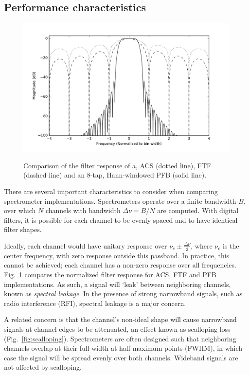 \documentclass{ws-rv961x669}
\begin{document}
\subsection{Performance characteristics}

\begin{figure}
 \centering
 \includegraphics[width=\textwidth]{./figures/fb_comparison}
 \label{fig:pfb_response}
 \caption{Comparison of the filter response of a, ACS (dotted line), FTF (dashed line) and an 8-tap, Hann-windowed PFB (solid line).\label{fig:leakage}}
\end{figure}

There are several important characteristics to consider when comparing spectrometer implementations. Spectrometers operate over a finite bandwidth $B$, over which $N$ channels with bandwidth $\Delta\nu = B/N$ are computed. With digital filters, it is possible for each channel to be evenly spaced and to have identical filter shapes. 

Ideally, each channel would have unitary response over $\nu_c \pm \frac{\Delta\nu}{2}$, where $\nu_c$ is the center frequency, with zero response outside this passband. In practice, this cannot be achieved; each channel has a non-zero response over all frequencies. Fig.~\ref{fig:leakage} compares the normalized filter response for ACS, FTF and PFB implementations. As such, a signal will `leak' between neighboring channels, known as \emph{spectral leakage}. In the presence of strong narrowband signals, such as radio interference (RFI), spectral leakage is a major concern.

A related concern is that the channel's non-ideal shape will cause narrowband signals at channel edges to be attenuated, an effect known as scalloping loss (Fig.~\ref{fig:scalloping}). Spectrometers are often designed such that neighboring channels overlap at their full-width at half-maximum points (FWHM), in which case the signal will be spread evenly over both channels. Wideband signals are not affected by scalloping. 
\end{document}
